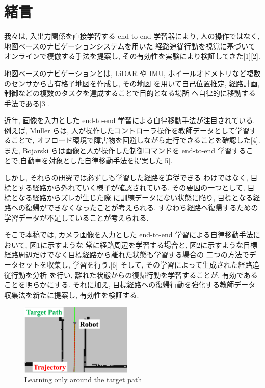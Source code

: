\documentclass{jarticle}
\begin{document}
\date{} %

\maketitle
\thispagestyle{empty}
\pagestyle{empty}

\small
\section{緒言}%
我々は, 入出力関係を直接学習する end-to-end 学習器により,
人の操作ではなく, 地図ベースのナビゲーションシステムを用いた
経路追従行動を視覚に基づいてオンラインで模倣する手法を提案し,
その有効性を実験により検証してきた[1][2].

地図ベースのナビゲーションとは, LiDAR や IMU, ホイールオドメトリなど複数のセンサから占有格子地図を作成し, その地図
を用いて自己位置推定, 経路計画, 制御などの複数のタスクを達成することで目的となる場所
へ自律的に移動する手法である[3].

近年, 画像を入力とした end-to-end 学習による自律移動手法が注目されている.
例えば, Muller らは, 人が操作したコントローラ操作を教師データとして学習することで, 
オフロード環境で障害物を回避しながら走行できることを確認した[4].
また, Bojarski らは画像と人が操作した制御コマンドを end-to-end 学習するこ
とで,自動車を対象とした自律移動手法を提案した[5].

しかし, それらの研究では必ずしも学習した経路を追従できる
わけではなく, 目標とする経路から外れていく様子が確認されている.
その要因の一つとして, 目標となる経路からズレが生じた際
に訓練データにない状態に陥り, 目標となる経路への復帰ができなくなったことが考えられる.
すなわち経路へ復帰するための学習データが不足していることが考えられる.

そこで本稿では, カメラ画像を入力とした end-to-end 学習による自律移動手法において, 図1に示すような
常に経路周辺を学習する場合と, 図2に示すような目標経路周辺だけでなく目標経路から離れた状態も学習する場合の
二つの方法でデータセットを収集し, 学習を行う.[6] そして, その学習によって生成された経路追従行動を分析
を行い, 離れた状態からの復帰行動を学習することが, 有効であることを明らかにする. それに加え, 
目標経路への復帰行動を強化する教師データ収集法を新たに提案し, 有効性を検証する.


\begin{figure}[h!]
  \centering
   \includegraphics[height=34mm]{./figs/only.png}
   \vspace*{-5mm}
   \caption{Learning only around the target path}
\end{figure}
\end{document}
